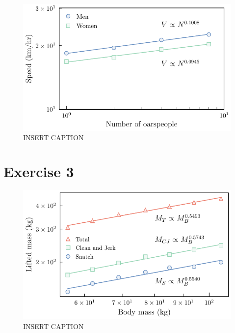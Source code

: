 \documentclass{article}
\begin{document}
\begin{figure}[h!]
  \includegraphics[width=\linewidth]{Q02/rowingPowerLaw.pdf}
  \caption{INSERT CAPTION}
  \label{fig:rowingPowerLawPlot}
\end{figure}



\section{Exercise 3}

\begin{figure}[h!]
  \includegraphics[width=\linewidth]{Q03/liftingPowerLaw.pdf}
  \caption{INSERT CAPTION}
  \label{fig:liftingPowerLawPlot}
\end{figure}
\end{document}

